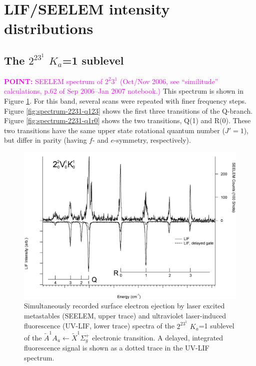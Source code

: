 \documentclass[12pt,draft]{mitthesis}
\newcommand{\POINT}[1]{\textcolor{magenta}{\textbf{POINT:} #1}}
\begin{document}
\section{LIF/SEELEM intensity distributions}

\subsection{The $2^23^1$ $K_a$=1 sublevel}

\POINT{SEELEM spectrum of $2^2 3^1$ (Oct/Nov 2006, see ``similitude''
  calculations, p.62 of Sep 2006--Jan 2007 notebook.)}  This spectrum
is shown in Figure \ref{fig:spectrum-2231}.  For this band, several
scans were repeated with finer frequency steps.  Figure
\ref{fig:spectrum-2231-q123} shows the first three transitions of the
Q-branch.  Figure \ref{fig:spectrum-2231-q1r0} shows the two
transitions, Q(1) and R(0).  These two transitions have the same upper
state rotational quantum number ($J'=1$), but differ in parity (having
$f$- and $e$-symmetry, respectively).

\begin{figure}
  \caption{
    Simultaneously recorded surface electron ejection by laser excited
    metastables (SEELEM, upper trace) and ultraviolet laser-induced
    fluorescence (UV-LIF, lower trace) spectra of the $2^23^1$ $K_a$=1
    sublevel of the $\tilde{A}^1A_u \leftarrow \tilde{X} ^1\Sigma_g^+$
    electronic transition. A delayed, integrated fluorescence signal
    is shown as a dotted trace in the UV-LIF spectrum.}
  \label{fig:spectrum-2231}
  \centering
  \includegraphics[width=8in,angle=90]{spectrum-2231.png}
\end{figure}
\end{document}
